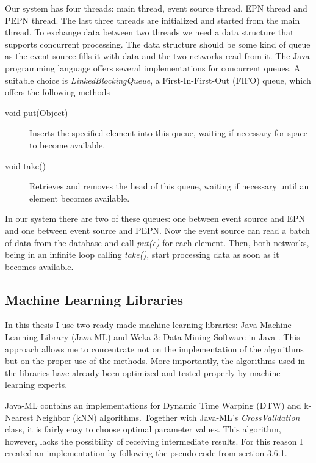 Our system has four threads: main thread, event source thread, EPN thread and PEPN thread. The last three threads are initialized and started from the main thread. To exchange data between two threads we need a data structure that supports concurrent processing. The data structure should be some kind of queue as the event source fills it with data and the two networks read from it. The Java programming language offers several implementations for concurrent queues. A suitable choice is \emph{LinkedBlockingQueue}, a First-In-First-Out (FIFO) queue, which offers the following methods \cite{Java}
\begin{description}
\item[void put(Object)]{Inserts the specified element into this queue, waiting if necessary for space to become available.}
\item[void take()]{Retrieves and removes the head of this queue, waiting if necessary until an element becomes available.}
\end{description}

In our system there are two of these queues: one between event source and EPN and one between event source and PEPN. Now the event source can read a batch of data from the database and call \emph{put(e)} for each element. Then, both networks, being in an infinite loop calling \emph{take()}, start processing data as soon as it becomes available.




\subsection{Machine Learning Libraries}
In this thesis I use two ready-made machine learning libraries: Java Machine Learning Library (Java-ML) \cite{javaml} and Weka 3: Data Mining Software in Java \cite{weka}. This approach allows me to concentrate not on the implementation of the algorithms but on the proper use of the methods. More importantly, the algorithms used in the libraries have already been optimized and tested properly by machine learning experts.

Java-ML contains an implementations for Dynamic Time Warping (DTW) and k-Nearest Neighbor (kNN) algorithms. Together with Java-ML's \emph{CrossValidation} class, it is fairly easy to choose optimal parameter values. This algorithm, however, lacks the possibility of receiving intermediate results. For this reason I created an implementation by following the pseudo-code from section 3.6.1.

